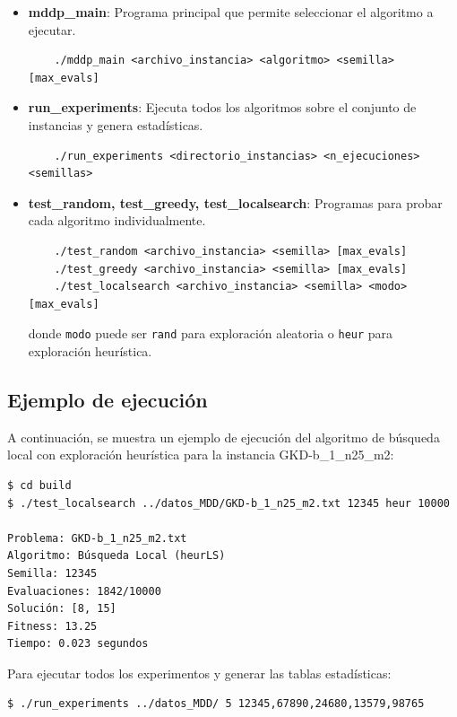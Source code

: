 \documentclass{article}
\begin{document}
\begin{itemize}
    \item \textbf{mddp\_main}: Programa principal que permite seleccionar el algoritmo a ejecutar.
    \begin{verbatim}
    ./mddp_main <archivo_instancia> <algoritmo> <semilla> [max_evals]
    \end{verbatim}
    
    \item \textbf{run\_experiments}: Ejecuta todos los algoritmos sobre el conjunto de instancias y genera estadísticas.
    \begin{verbatim}
    ./run_experiments <directorio_instancias> <n_ejecuciones> <semillas>
    \end{verbatim}
    
    \item \textbf{test\_random, test\_greedy, test\_localsearch}: Programas para probar cada algoritmo individualmente.
    \begin{verbatim}
    ./test_random <archivo_instancia> <semilla> [max_evals]
    ./test_greedy <archivo_instancia> <semilla> [max_evals]
    ./test_localsearch <archivo_instancia> <semilla> <modo> [max_evals]
    \end{verbatim}
    donde \texttt{modo} puede ser \texttt{rand} para exploración aleatoria o \texttt{heur} para exploración heurística.
\end{itemize}

\subsection{Ejemplo de ejecución}

A continuación, se muestra un ejemplo de ejecución del algoritmo de búsqueda local con exploración heurística para la instancia GKD-b\_1\_n25\_m2:

\begin{verbatim}
$ cd build
$ ./test_localsearch ../datos_MDD/GKD-b_1_n25_m2.txt 12345 heur 10000
 
Problema: GKD-b_1_n25_m2.txt
Algoritmo: Búsqueda Local (heurLS)
Semilla: 12345
Evaluaciones: 1842/10000
Solución: [8, 15]
Fitness: 13.25
Tiempo: 0.023 segundos
\end{verbatim}

Para ejecutar todos los experimentos y generar las tablas estadísticas:

\begin{verbatim}
$ ./run_experiments ../datos_MDD/ 5 12345,67890,24680,13579,98765
\end{verbatim}
\end{document}
